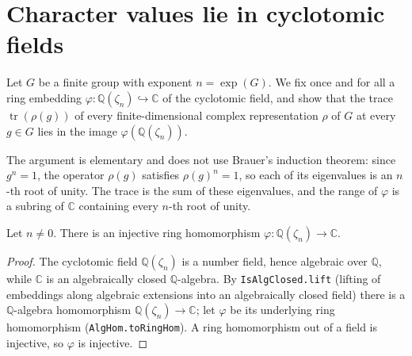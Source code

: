 


\section{Character values lie in cyclotomic fields}

Let $G$ be a finite group with exponent $n = \exp(G)$. We fix once and for all a
ring embedding $\varphi : \mathbb{Q}(\zeta_n) \hookrightarrow \mathbb{C}$ of the
cyclotomic field, and show that the trace $\operatorname{tr}(\rho(g))$ of every
finite-dimensional complex representation $\rho$ of $G$ at every $g \in G$ lies in
the image $\varphi(\mathbb{Q}(\zeta_n))$.

The argument is elementary and does not use Brauer's induction theorem: since $g^n
= 1$, the operator $\rho(g)$ satisfies $\rho(g)^n = 1$, so each of its eigenvalues
is an $n$-th root of unity. The trace is the sum of these eigenvalues, and the
range of $\varphi$ is a subring of $\mathbb{C}$ containing every $n$-th root of
unity.

\begin{lemma}
    \label{lem:cyclotomic-embeds-injective}
    \leanok
    Let $n \neq 0$. There is an injective ring homomorphism
    $\varphi : \mathbb{Q}(\zeta_n) \to \mathbb{C}$.
\end{lemma}
\begin{proof}
    The cyclotomic field $\mathbb{Q}(\zeta_n)$ is a number field, hence algebraic
    over $\mathbb{Q}$, while $\mathbb{C}$ is an algebraically closed
    $\mathbb{Q}$-algebra. By \texttt{IsAlgClosed.lift} (lifting of embeddings
    along algebraic extensions into an algebraically closed field) there is a
    $\mathbb{Q}$-algebra homomorphism $\mathbb{Q}(\zeta_n) \to \mathbb{C}$; let
    $\varphi$ be its underlying ring homomorphism (\texttt{AlgHom.toRingHom}). A
    ring homomorphism out of a field is injective, so $\varphi$ is injective.
\end{proof}

